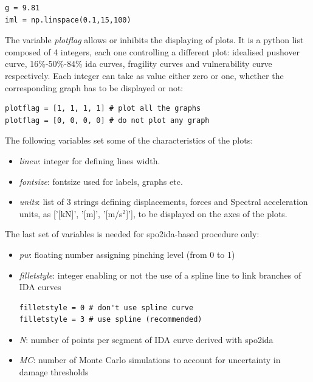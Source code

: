 \begin{Verbatim}[frame=single, commandchars=\\\{\}, samepage=true]
g = 9.81
iml = np.linspace(0.1,15,100)
\end{Verbatim}

The variable \textit{plotflag} allows or inhibits the displaying of plots. It is a python list composed of 4 integers, each one controlling a different plot: idealised pushover curve, 16\%-50\%-84\% ida curves, fragility curves and vulnerability curve respectively. Each integer can take as value either zero or one, whether the corresponding graph has to be displayed or not:

\begin{Verbatim}[frame=single, commandchars=\\\{\}, samepage=true]
plotflag = [1, 1, 1, 1] # plot all the graphs
plotflag = [0, 0, 0, 0] # do not plot any graph
\end{Verbatim}

The following variables set some of the characteristics of the plots:

\begin{itemize}
\item \textit{linew}: integer for defining lines width.
\item \textit{fontsize}: fontsize used for labels, graphs etc.
\item \textit{units}: list of 3 strings defining displacements, forces and Spectral acceleration units, as ['[kN]', '[m]', '[m/s$^2$]'], to be displayed on the axes of the plots.
\end{itemize}

The last set of variables is needed for spo2ida-based procedure only:

\begin{itemize}
\item \textit{pw}: floating number assigning pinching level (from 0 to 1)
\item \textit{filletstyle}: integer enabling or not the use of a spline line to link branches of IDA curves

\begin{Verbatim}[frame=single, commandchars=\\\{\}, samepage=true]
filletstyle = 0 # don't use spline curve
filletstyle = 3 # use spline (recommended)
\end{Verbatim}

\item \textit{N}: number of points per segment of IDA curve derived with spo2ida
\item \textit{MC}: number of Monte Carlo simulations to account for uncertainty in damage thresholds
\end{itemize}

